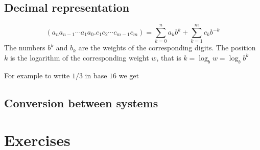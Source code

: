 \subsection{Decimal representation}
\[
(a_{n}a_{n-1} \cdots a_{1}a_{0} . c_{1}c_{2} \cdots c_{m-1}c_{m}) =
    \sum_{k=0}^{n}a_{k}b^{k} + \sum_{k=1}^{m}c_{k}b^{-k}
\]
The numbers $b^{k}$ and $b_{k}$ are the weights of the corresponding digits. The position $k$ is the logarithm of the corresponding weight $w$, that is $k = \log_{b} w = \log_{b} b^k$



For example to write $1/3$ in base $16$ we get

\subsection{Conversion between systems}

\newpage
\section{Exercises}


